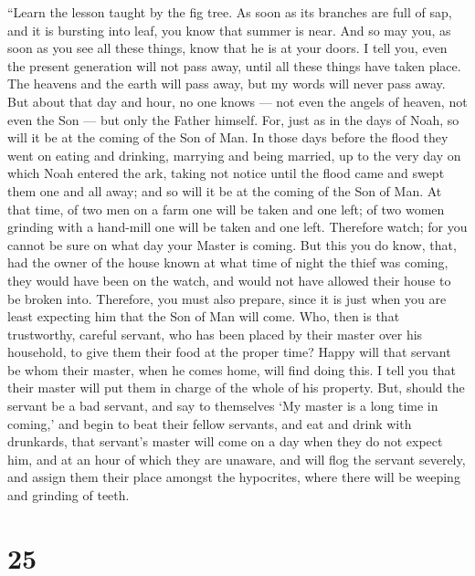 ``Learn the lesson taught by the fig tree. As soon as its
branches are full of sap, and it is bursting into leaf, you know that
summer is near.  And so may you, as soon as you see all
these things, know that he is at your doors.  I tell you,
even the present generation will not pass away, until all these things
have taken place.  The heavens and the earth will pass
away, but my words will never pass away.  But about that
day and hour, no one knows --- not even the angels of heaven, not even
the Son --- but only the Father himself.  For, just as in
the days of Noah, so will it be at the coming of the Son of Man.
 In those days before the flood they went on eating and
drinking, marrying and being married, up to the very day on which Noah
entered the ark,  taking not notice until the flood came
and swept them one and all away; and so will it be at the coming of the
Son of Man.  At that time, of two men on a farm one will be
taken and one left;  of two women grinding with a hand-mill
one will be taken and one left.  Therefore watch; for you
cannot be sure on what day your Master is coming.  But this
you do know, that, had the owner of the house known at what time of
night the thief was coming, they would have been on the watch, and would
not have allowed their house to be broken into.  Therefore,
you must also prepare, since it is just when you are least expecting him
that the Son of Man will come.  Who, then is that
trustworthy, careful servant, who has been placed by their master over
his household, to give them their food at the proper time? 
Happy will that servant be whom their master, when he comes home, will
find doing this.  I tell you that their master will put
them in charge of the whole of his property.  But, should
the servant be a bad servant, and say to themselves `My master is a long
time in coming,'  and begin to beat their fellow servants,
and eat and drink with drunkards,  that servant's master
will come on a day when they do not expect him, and at an hour of which
they are unaware,  and will flog the servant severely, and
assign them their place amongst the hypocrites, where there will be
weeping and grinding of teeth.

\hypertarget{section-24}{%
\section{25}\label{section-24}}


